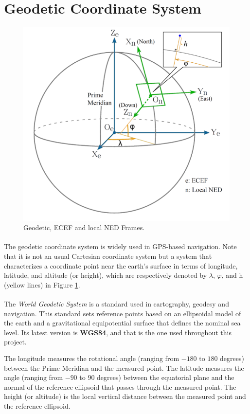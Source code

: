 \section{Geodetic Coordinate System}\label{sec:coord}

\begin{figure}[H]
   \centering
    \includegraphics[width=.70\textwidth]{figures/GeoTemp1.png} 
    \caption{Geodetic, ECEF and local NED Frames.}  
    \label{fig:Geodetic1}
\end{figure}

\paragraph{}The geodetic coordinate system is widely used in GPS-based navigation. Note that it is not an usual Cartesian coordinate system but a system that characterizes a coordinate point near the earth’s surface in terms of longitude, latitude, and altitude (or height), which are respectively denoted by $\lambda$, $\varphi$, and h (yellow lines) in Figure \ref{fig:Geodetic1}.

\paragraph{}The \textit{World Geodetic System} is a standard used in cartography, geodesy and navigation. This standard sets reference points based on an ellipsoidal model of the earth and a gravitational equipotential surface that defines the nominal sea level. Its latest version is \textbf{WGS84}, and that is the one used throughout this project. 

The longitude measures the rotational angle (ranging from $-180$ to $180$ degrees) between the Prime Meridian and the measured point. The latitude measures the angle (ranging from $-90$ to $90$ degrees) between the equatorial plane and the normal of the reference ellipsoid that passes through the measured point. The height (or altitude) is the local vertical distance between the measured point and the reference ellipsoid.

